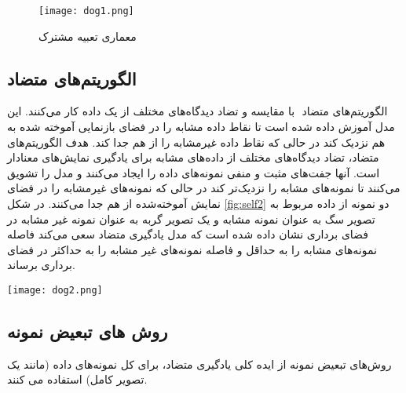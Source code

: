 \begin{figure}[htbp]
	\centering
	\texttt{[image: dog1.png]}
	\captionsetup{font=small} %
	\caption{معماری تعبیه مشترک}
	\label{fig:self1}
\end{figure}

\subsection{ الگوریتم‌های متضاد}

الگوریتم‌های متضاد  ‌ با مقایسه و تضاد دیدگاه‌های مختلف از یک داده کار می‌کنند. این مدل آموزش داده شده است تا نقاط داده مشابه را در فضای بازنمایی آموخته شده به هم نزدیک کند در حالی که نقاط داده غیرمشابه را از هم جدا کند. 
هدف الگوریتم‌های متضاد، تضاد دیدگاه‌های مختلف از داده‌های مشابه برای یادگیری نمایش‌های معنادار است. آنها جفت‌های مثبت و منفی نمونه‌های داده را ایجاد می‌کنند و مدل را تشویق می‌کنند تا نمونه‌های مشابه را نزدیک‌تر کند در حالی که نمونه‌های غیرمشابه را در فضای نمایش آموخته‌شده از هم جدا می‌کنند. 
\citep{liu2021self}
در شکل  \ref{fig:self2} دو نمونه از داده مربوط به تصویر سگ به عنوان نمونه مشابه و یک تصویر گربه به عنوان نمونه غیر مشابه در فضای برداری نشان داده شده است که مدل یادگیری متضاد سعی ‌می‌کند فاصله نمونه‌های مشابه را به حداقل و فاصله نمونه‌های غیر مشابه را به حداکثر در فضای برداری برساند.
\citep{falcon2020framework}
%	

\begin{minipage}{\linewidth}
	\centering
	\texttt{[image: dog2.png]}
	\captionsetup{font=small} %
	\label{fig:self2}
\end{minipage}



\subsection{ روش های تبعیض نمونه}

روش‌های تبعیض نمونه ‌از ایده کلی یادگیری متضاد، برای کل نمونه‌های داده (مانند یک تصویر کامل) استفاده می کنند.

